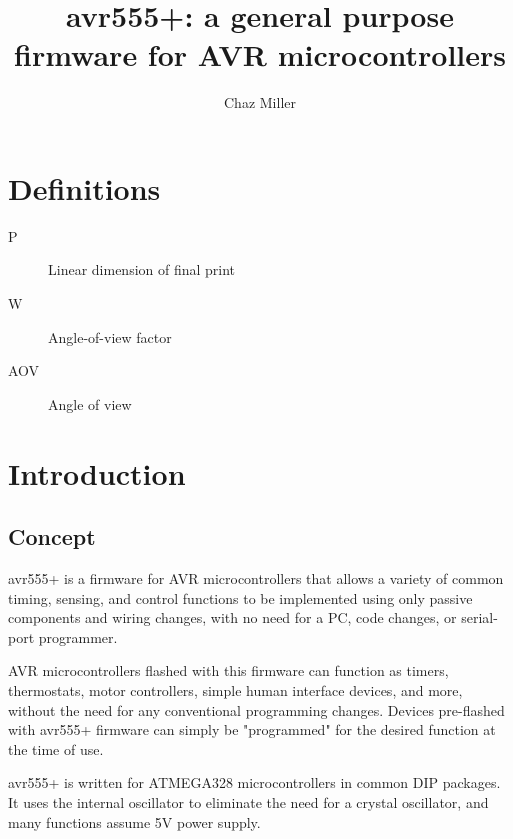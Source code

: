 \documentclass[dvips,12pt]{article}
\title{avr555+: a general purpose firmware for AVR microcontrollers}
\author{Chaz Miller}
\begin{document}
\frenchspacing
\maketitle
\tableofcontents


\section{Definitions}
\begin{adjustwidth}{2.5em}{0pt}
\begin{description}
    \item[P] Linear dimension of final print 
    \item[W] Angle-of-view factor 
    \item[AOV] Angle of view
\end{description}
\end{adjustwidth}

\section{Introduction}

\subsection{Concept}
avr555+ is a firmware for AVR microcontrollers that allows a variety of common timing, sensing, and control functions to be implemented using only passive components and wiring changes, with no need for a PC, code changes, or serial-port programmer.

AVR microcontrollers flashed with this firmware can function as timers, thermostats, motor controllers, simple human interface devices, and more, without the need for any conventional programming changes. Devices pre-flashed with avr555+ firmware can simply be "programmed" for the desired function at the time of use.

avr555+ is written for ATMEGA328 microcontrollers in common DIP packages. It uses the internal oscillator to eliminate the need for a crystal oscillator, and many functions assume 5V power supply.
\end{document}
